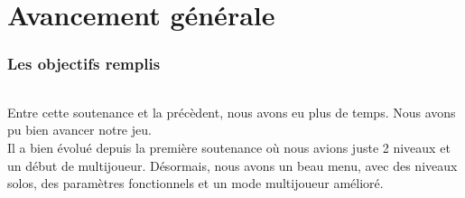 \documentclass[titlepage, 13px, a4paper]{article}
\begin{document}
\newpage





\part{Avancement générale}  
\section{Les objectifs remplis} 
\paragraph{} \hspace{0pt} 
Entre cette soutenance et la précèdent, nous avons eu plus de temps. Nous avons pu bien avancer notre jeu. \\
Il a bien évolué depuis la première soutenance où nous avions juste 2 niveaux et un début de multijoueur.
Désormais, nous avons un beau menu, avec des niveaux solos, des paramètres fonctionnels et un mode multijoueur amélioré.
\end{document}
